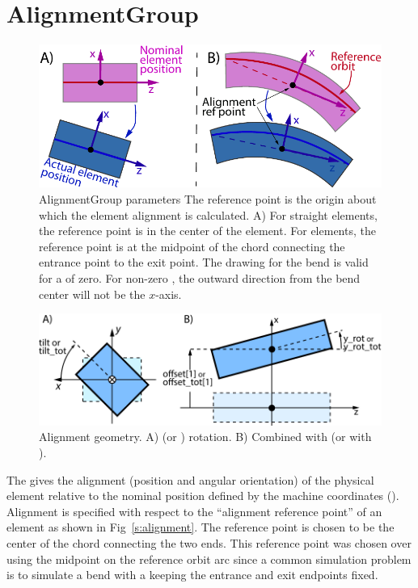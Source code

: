 \newpage

\section{AlignmentGroup}
\label{s:alignment.g}

\begin{figure}[bt]
\centering \includegraphics{alignment-ref.pdf} 
\caption[Element alignment.]  
{AlignmentGroup parameters The reference point is the origin
about which the element alignment is calculated. 
A) For straight elements, the reference point is in the center of the element. 
For  elements, the reference point is at the midpoint of the chord connecting
the entrance point to the exit point. The drawing for the bend is valid for a 
of zero. For non-zero , the outward direction from the bend center will not be
the $x$-axis. 
}  \label{f:alignment}
\end{figure}

\begin{figure}
\centering \includegraphics{alignment2.pdf} \caption[Alignment geometry.]  
{Alignment geometry. A)  (or ) rotation. B) Combined
 with  (or  with ).
}  \label{f:alignment}
\end{figure}

The  gives the alignment (position and angular orientation) of the physical element 
relative to the nominal position defined by the machine coordinates ().
Alignment is specified with respect to the ``alignment reference point'' of an element as shown
in Fig~\ref{s:alignment}. The  reference point is chosen to be the center of the chord
connecting the two ends. 
This reference point was chosen over using the midpoint on the reference orbit arc since a 
common simulation problem is to simulate a bend with a  keeping the entrance and exit
endpoints fixed.

